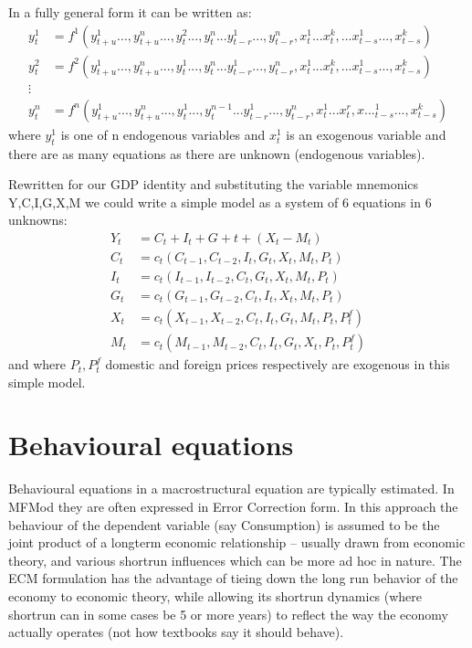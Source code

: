 \documentclass[letterpaper,10pt,english]{jupyterBook}
\begin{document}
\sphinxAtStartPar
In a fully general form it can be written as:
\begin{align*}
y_t^1  &=  f^1(y_{t+u}^1...,y_{t+u}^n...,y_t^2...,y_{t}^n...y_{t-r}^1...,y_{t-r}^n,x_t^1...x_{t}^k,...x_{t-s}^1...,x_{t-s}^k) \\
y_t^2  &=  f^2(y_{t+u}^1...,y_{t+u}^n...,y_t^1...,y_{t}^n...y_{t-r}^1...,y_{t-r}^n,x_t^1...x_{t}^k,...x_{t-s}^1...,x_{t-s}^k) \\
\vdots \\
y_t^n  &=  f^n(y_{t+u}^1...,y_{t+u}^n...,y_t^1...,y_{t}^{n-1}...y_{t-r}^1...,y_{t-r}^n,x_t^1...x_{t}^r,x..._{t-s}^1...,x_{t-s}^k)
\end{align*}
\sphinxAtStartPar
where \( y_t^1 \) is one of n endogenous variables and \(x_t^1\) is an exogenous variable and there are as many equations as there are unknown (endogenous variables).

\sphinxAtStartPar
Rewritten for our GDP identity and substituting the variable mnemonics Y,C,I,G,X,M we could write a simple model as a system of 6 equations in 6 unknowns:
\begin{align*}
Y_t  &=  C_t+I_t+G+t+ (X_t-M_t) \\
C_t &= c_t(C_{t-1},C_{t-2},I_t,G_t,X_t,M_t,P_t)\\
I_t &= c_t(I_{t-1},I_{t-2},C_t,G_t,X_t,M_t,P_t)\\
G_t &= c_t(G_{t-1},G_{t-2},C_t,I_t,X_t,M_t,P_t)\\
X_t &= c_t(X_{t-1},X_{t-2},C_t,I_t,G_t,M_t,P_t,P^f_t)\\
M_t &= c_t(M_{t-1},M_{t-2},C_t,I_t,G_t,X_t,P_t,P^f_t)
\end{align*}
\sphinxAtStartPar
and where \(P_t, P^f_t\) domestic and foreign prices respectively are exogenous in this simple model.


\section{Behavioural equations}
\label{\detokenize{content/02_MacrostructuralModels/MacroStructuralModels:behavioural-equations}}
\sphinxAtStartPar
Behavioural equations in a macrostructural equation are typically estimated. In MFMod they are often expressed in Error Correction form. In this approach the behaviour of the dependent variable (say Consumption) is assumed to be the joint product of a long\sphinxhyphen{}term economic relationship – usually drawn from economic theory, and various short\sphinxhyphen{}run influences which can be more ad hoc in nature. The ECM formulation has the advantage of tieing down the long run behavior of the economy to economic theory, while allowing its short\sphinxhyphen{}run dynamics (where short\sphinxhyphen{}run can in some cases be 5 or more years) to reflect the way the economy actually operates (not how textbooks say it should behave).
\end{document}
